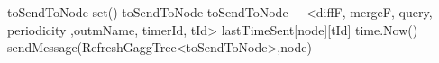 \begin{algorithm}
\begin{algorithmic}[1]
     \label{alg:mon:global_agg:propag_procedure}
            \State toSendToNode \asdassign set()
                    \State toSendToNode \asdassign toSendToNode + <diffF, mergeF, query, periodicity ,outmName, timerId, tId>
                \EndIf
            \EndFor
            \State lastTimeSent[node][tId] \asdassign time.Now()
            \State sendMessage(RefreshGaggTree<toSendToNode>,node)
        \EndFor
    \asdend

    \end{algorithmic}
\end{algorithm}
    